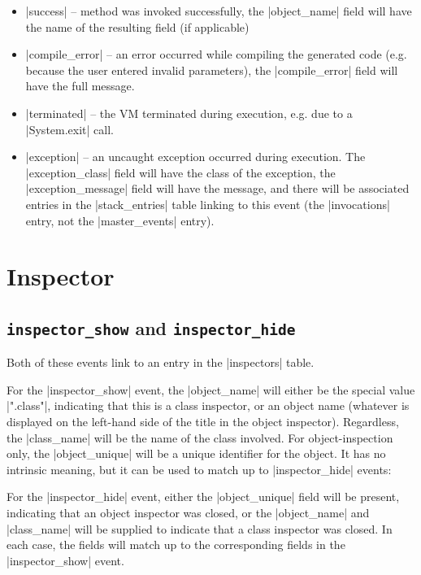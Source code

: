 \documentclass{book}
\begin{document}
\begin{itemize}
\item |success| -- method was invoked successfully, the |object_name| field will have the name of the resulting
  field (if applicable)
\item |compile_error| -- an error occurred while compiling the generated code
  (e.g. because the user entered invalid parameters), the |compile_error|
  field will have the full message.
\item |terminated| -- the VM terminated during execution, e.g. due to a
  |System.exit| call.
\item |exception| -- an uncaught exception occurred during execution.  The
  |exception_class| field will have the class of the exception, the
  |exception_message| field will have the message, and there will be
  associated entries in the |stack_entries| table linking to this event (the
  |invocations| entry, not the |master_events| entry).
\end{itemize}

\section{Inspector}


\subsection{\lstinline|inspector_show| and \lstinline|inspector_hide|}

Both of these events link to an entry in the |inspectors| table.

For the |inspector_show| event, the |object_name| will either be the special
value |".class"|, indicating that this is a class inspector, or an object name
(whatever is displayed on the left-hand side of the title in the object
inspector).  Regardless, the |class_name| will be the name of the class
involved.  For object-inspection only, the |object_unique| will be a unique
identifier for the object.  It has no intrinsic meaning, but it can be used to
match up to |inspector_hide| events:

For the |inspector_hide| event, either the |object_unique| field will be
present, indicating that an object inspector was closed, or the |object_name|
and |class_name| will be supplied to indicate that a class inspector was
closed.  In each case, the fields will match up to the corresponding fields in
the |inspector_show| event.
\end{document}
